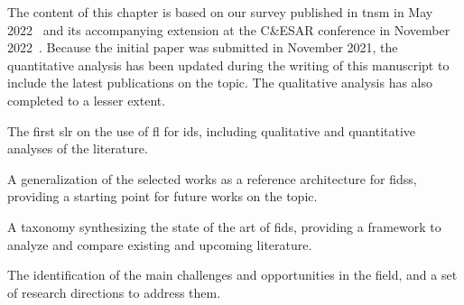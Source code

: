 The content of this chapter is based on our survey published in \gls{tnsm} in May 2022~\cite{lavaur_EvolutionFederatedLearningbased_2022} and its accompanying extension at the C\&ESAR conference in November 2022~\cite{lavaur_Federatedlearningenabler_2022}.
Because the initial paper was submitted in November 2021, the quantitative analysis has been updated during the writing of this manuscript to include the latest publications on the topic.
The qualitative analysis has also completed to a lesser extent.

\begin{contribs}
  \item The first \gls{slr} on the use of \gls{fl} for \gls{ids}, including qualitative and quantitative analyses of the literature.
  \item A generalization of the selected works as a reference architecture for \glspl{fids}, providing a starting point for future works on the topic.
  \item A taxonomy synthesizing the state of the art of \gls{fids}, providing a framework to analyze and compare existing and upcoming literature.
  \item The identification of the main challenges and opportunities in the field, and a set of research directions to address them.
\end{contribs}

